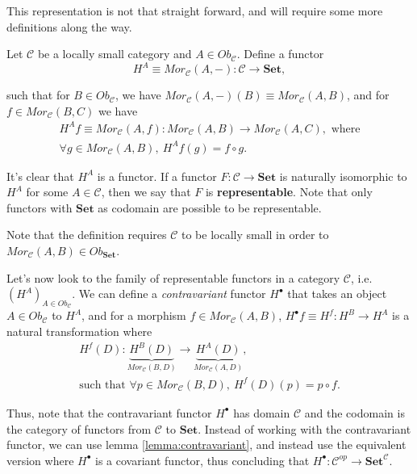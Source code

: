 This representation is not that straight forward, and will require
some more definitions along the way.

\begin{definition}
	Let $\mathcal C$ be a locally small category and $A \in Ob_\mathcal C$.
	Define a functor
	\begin{displaymath}
		H^A \equiv Mor_\mathcal C(A,-): \mathcal C \to \mathbf{Set},
	\end{displaymath}

	such that for $B \in Ob_\mathcal C$, we have $Mor_\mathcal C (A,-)(B) \equiv Mor_\mathcal C (A,B)$, and
	for $ f \in Mor_\mathcal C (B,C)$ we have
	\begin{gather*}
		H^A f \equiv Mor_\mathcal C(A,f) : Mor_\mathcal C(A,B) \to Mor_\mathcal C(A,C), \text{ where} \\
		\forall g \in Mor_\mathcal C(A,B) , \ H^A f (g) = f \circ g.
	\end{gather*}

	It's clear that $H^A$ is a functor. If a functor $F:\mathcal C \to \mathbf{Set}$
	is naturally isomorphic to $H^A$ for some $A \in \mathcal C$, then we say that
	$F$ is \textbf{representable}. Note that only functors with $\mathbf{Set}$
	as codomain are possible to be representable.
\end{definition}
Note that the definition requires $\mathcal C$ to be locally small in order to $Mor_\mathcal C (A,B) \in Ob_{\mathbf{Set}}$.

Let's now look to the family of representable functors in a category $\mathcal C$, i.e.
$(H^A)_{A \in Ob_\mathcal C}$. We can define a \textit{contravariant} functor
$H^\bullet$ that takes an object $A \in Ob_\mathcal C$ to $H^A$, and for
a morphism $f \in Mor_\mathcal C (A,B)$, $H^\bullet f \equiv H^f : H^B \to H^A$ is a natural
transformation where
\begin{gather*}
	H^f(D):
	\underbrace{H^B(D)}_{Mor_\mathcal C(B,D)} \to
	\underbrace{H^A(D)}_{Mor_\mathcal C(A,D)}, \\
	\text{such that }\forall p \in Mor_\mathcal C (B,D), \ H^f (D) (p) = p \circ f.
\end{gather*}

Thus, note that the contravariant functor $H^\bullet$ has domain $\mathcal C$
and the codomain is the category of functors from $\mathcal C$ to $\mathbf{Set}$.
Instead of working with the contravariant functor, we can use lemma
\ref{lemma:contravariant}, and instead use the equivalent version where
$H^\bullet$ is a covariant functor, thus concluding that
$H^\bullet: \mathcal C^{op} \to \mathbf{Set}^\mathcal C$.


